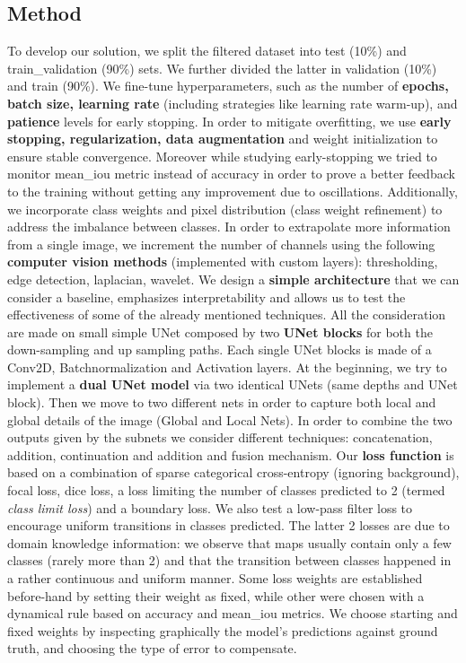 \documentclass[11pt]{template}
\begin{document}
\begin{multicols}{2}
\section{Method}
To develop our solution, we split the filtered dataset into test (10\%) and train\_validation (90\%) sets. We further divided the latter in validation (10\%) and train (90\%). 
We fine-tune hyperparameters, such as the number of \textbf{epochs, batch size, learning rate} (including strategies like learning rate warm-up), and \textbf{patience} levels for early stopping.
In order to mitigate overfitting, we use \textbf{early stopping, regularization, data augmentation} and weight initialization to ensure stable convergence.
Moreover while studying early-stopping we tried to monitor mean\_iou metric instead of accuracy in order to prove a better feedback to the training without getting any improvement due to oscillations.
Additionally, we incorporate class weights and pixel distribution (class weight refinement) to address the imbalance between classes.
In order to extrapolate more information from a single image, we increment the number of channels using the following \textbf{computer vision methods} (implemented with custom layers): thresholding, edge detection, laplacian, wavelet.
We design a \textbf{simple architecture} that we can consider a baseline, emphasizes interpretability and allows us to test the effectiveness of some of the already mentioned techniques.
All the consideration are made on small simple UNet composed by two \textbf{UNet blocks} for both the down-sampling and up sampling paths. Each single UNet blocks is made of a Conv2D, Batchnormalization and Activation layers. 
At the beginning, we try to implement a \textbf{dual UNet model} via two identical UNets (same depths and UNet block). Then we move to two different nets in order to capture both local and global details of the image (Global and Local Nets).
In order to combine the two outputs given by the subnets we consider different techniques: concatenation, addition, continuation and addition and fusion mechanism. 
Our \textbf{loss function} is based on a combination of sparse categorical cross-entropy (ignoring background), focal loss, dice loss, a loss limiting the number of classes predicted to 2 (termed \textit{class limit loss}) and a boundary loss. We also test a low-pass filter loss to encourage uniform transitions in classes predicted. The latter 2 losses are due to domain knowledge information: we observe that maps usually contain only a few classes (rarely more than 2) and that the transition between classes happened in a rather continuous and uniform manner. Some loss weights are established before-hand by setting their weight as fixed, while other were chosen with a dynamical rule based on accuracy and mean\_iou metrics. We choose starting and fixed weights by inspecting graphically the model's predictions against ground truth, and choosing the type of error to compensate.

\end{multicols}
\end{document}
